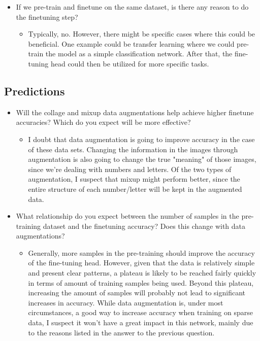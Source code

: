 \documentclass[english,11pt,a4paper,titlepage]{report}
\begin{document}
\begin{itemize}
\begin{itemize}
		\end{itemize}
		\item If we pre-train and finetune on the same dataset, is there any reason to do the finetuning step?
		\begin{itemize}
			\item Typically, no. However, there might be specific cases where this could be beneficial. One example could be transfer learning where we could pre-train the model as a simple classification network. After that, the fine-tuning head could then be utilized for more specific tasks.
		\end{itemize}
	\end{itemize}
	\subsection*{Predictions}
	\begin{itemize}
		\item Will the collage and mixup data augmentations help achieve higher finetune accuracies? Which do you expect will be more effective?
		\begin{itemize}
			\item I doubt that data augmentation is going to improve accuracy in the case of these data sets. Changing the information in the images through augmentation is also going to change the true "meaning" of those images, since we're dealing with numbers and letters. Of the two types of augmentation, I suspect that mixup might perform better, since the entire structure of each number/letter will be kept in the augmented data.
		\end{itemize}
		\item What relationship do you expect between the number of samples in the pre-training dataset and the finetuning accuracy? Does this change with data augmentations?
		\begin{itemize}
			\item Generally, more samples in the pre-training should improve the accuracy of the fine-tuning head. However, given that the data is relatively simple and present clear patterns, a plateau is likely to be reached fairly quickly in terms of amount of training samples being used. Beyond this plateau, increasing the amount of samples will probably not lead to significant increases in accuracy. While data augmentation is, under most circumstances, a good way to increase accuracy when training on sparse data, I suspect it won't have a great impact in this network, mainly due to the reasons listed in the answer to the previous question.
		\end{itemize}
	\end{itemize}
	
	
	
	
\end{document}
